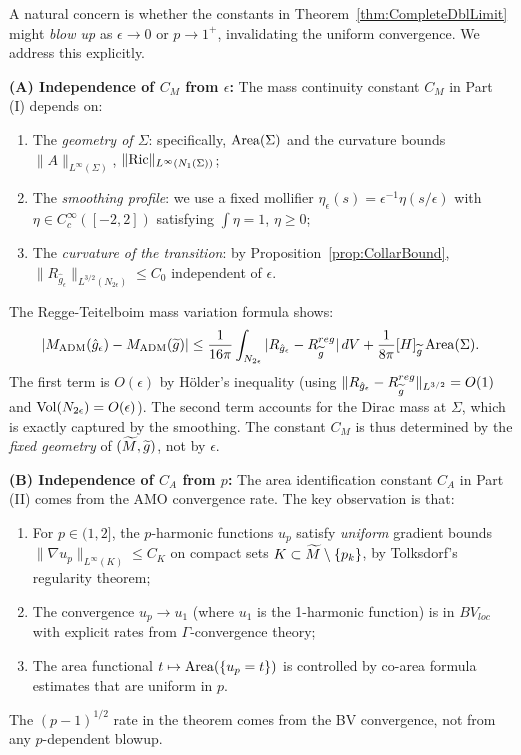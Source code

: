 \begin{remark}\label{rem:UniformBoundsNonDegenerate}
A natural concern is whether the constants in Theorem~\ref{thm:CompleteDblLimit} might \emph{blow up} as $\epsilon \to 0$ or $p \to 1^+$, invalidating the uniform convergence. We address this explicitly.

\textbf{(A) Independence of $C_M$ from $\epsilon$:}
The mass continuity constant $C_M$ in Part (I) depends on:
\begin{enumerate}
    \item The \emph{geometry of $\Sigma$}: specifically, $\operatorname{Area}(\Sigma)$ and the curvature bounds $\|A\|_{L^\infty(\Sigma)}$, $\|\mathrm{Ric}\|_{L^\infty(N_1(\Sigma))}$;
    \item The \emph{smoothing profile}: we use a fixed mollifier $\eta_\epsilon(s) = \epsilon^{-1}\eta(s/\epsilon)$ with $\eta \in C^\infty_c([-2,2])$ satisfying $\int \eta = 1$, $\eta \ge 0$;
    \item The \emph{curvature of the transition}: by Proposition~\ref{prop:CollarBound}, $\|R_{\hat{g}_\epsilon}\|_{L^{3/2}(N_{2\epsilon})} \le C_0$ independent of $\epsilon$.
\end{enumerate}
The Regge-Teitelboim mass variation formula shows:
\[
    |M_{\mathrm{ADM}}(\hat{g}_\epsilon) - M_{\mathrm{ADM}}(\widetilde{g})| \le \frac{1}{16\pi} \int_{N_{2\epsilon}} |R_{\hat{g}_\epsilon} - R_{\widetilde{g}}^{reg}| \, dV + \frac{1}{8\pi}[H]_{\widetilde{g}} \operatorname{Area}(\Sigma).
\]
The first term is $O(\epsilon)$ by H\"older's inequality (using $\|R_{\hat{g}_\epsilon} - R_{\widetilde{g}}^{reg}\|_{L^{3/2}} = O(1)$ and $\operatorname{Vol}(N_{2\epsilon}) = O(\epsilon)$). The second term accounts for the Dirac mass at $\Sigma$, which is exactly captured by the smoothing. The constant $C_M$ is thus determined by the \emph{fixed geometry} of $(\widetilde{M}, \widetilde{g})$, not by $\epsilon$.

\textbf{(B) Independence of $C_A$ from $p$:}
The area identification constant $C_A$ in Part (II) comes from the AMO convergence rate. The key observation is that:
\begin{enumerate}
    \item For $p \in (1, 2]$, the $p$-harmonic functions $u_p$ satisfy \emph{uniform} gradient bounds $\|\nabla u_p\|_{L^\infty(K)} \le C_K$ on compact sets $K \subset \widetilde{M} \setminus \{p_k\}$, by Tolksdorf's regularity theorem;
    \item The convergence $u_p \to u_1$ (where $u_1$ is the 1-harmonic function) is in $BV_{loc}$ with explicit rates from $\Gamma$-convergence theory;
    \item The area functional $t \mapsto \operatorname{Area}(\{u_p = t\})$ is controlled by co-area formula estimates that are uniform in $p$.
\end{enumerate}
The $(p-1)^{1/2}$ rate in the theorem comes from the BV convergence, not from any $p$-dependent blowup.


\end{remark}
